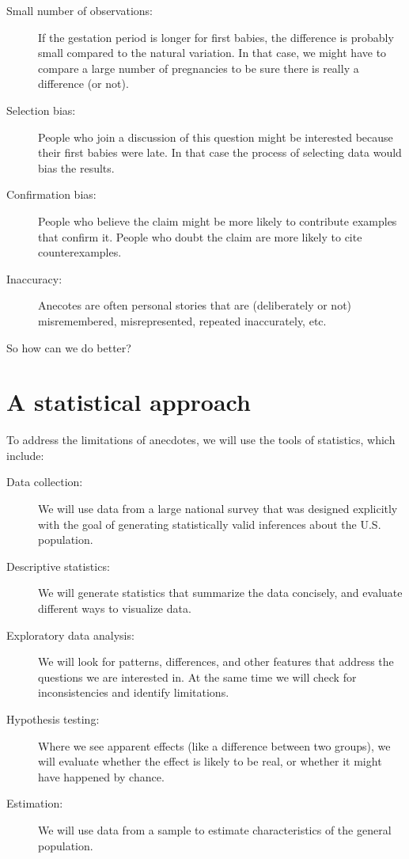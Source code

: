 \documentclass[12pt]{book}
\begin{document}
\begin{description}

\item[Small number of observations:] If the gestation period is longer
  for first babies, the difference is probably small compared to the
  natural variation.  In that case, we might have to compare a large
  number of pregnancies to be sure there is really a difference (or
  not).

\item[Selection bias:] People who join a discussion of this question
  might be interested because their first babies were late.  In that
  case the process of selecting data would bias the results.

\item[Confirmation bias:] People who believe the claim might be more
  likely to contribute examples that confirm it.  People who doubt the
  claim are more likely to cite counterexamples.

\item[Inaccuracy:] Anecotes are often personal stories that are
  (deliberately or not) misremembered, misrepresented, repeated
  inaccurately, etc.

\end{description}

So how can we do better?

\section{A statistical approach}

To address the limitations of anecdotes, we will use the tools
of statistics, which include:

\begin{description}

\item[Data collection:] We will use data from a large national survey
  that was designed explicitly with the goal of generating
  statistically valid inferences about the U.S. population.

\item[Descriptive statistics:] We will generate statistics that
  summarize the data concisely, and evaluate different ways to
  visualize data.

\item[Exploratory data analysis:] We will look for
  patterns, differences, and other features that address the questions
  we are interested in.  At the same time we will check for
  inconsistencies and identify limitations.

\item[Hypothesis testing:] Where we see apparent effects (like a
  difference between two groups), we will evaluate whether the effect
  is likely to be real, or whether it might have happened by chance.

\item[Estimation:] We will use data from a sample to estimate
  characteristics of the general population.

\end{description}
\end{document}
